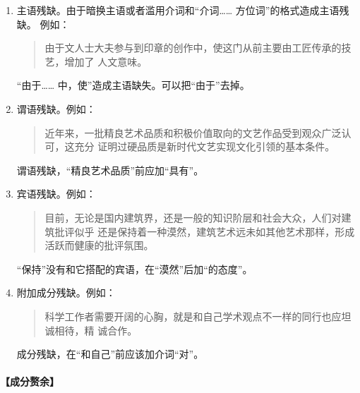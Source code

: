 \documentclass[final,oneside]{ctexbook}
\newenvironment{equotation}{\begin{quotation}\kaishu}{\end{quotation}}
\begin{document}
\begin{enumerate}
  \item 主语残缺。由于暗换主语或者滥用介词和“介词…… 方位词”的格式造成主语残缺。
    例如：

    \begin{equotation}
      由于文人士大夫参与到印章的创作中，使这门从前主要由工匠传承的技艺，增加了
      人文意味。
    \end{equotation}

    “由于…… 中，使”造成主语缺失。可以把“由于”去掉。

  \item 谓语残缺。例如：

    \begin{equotation}
      近年来，一批精良艺术品质和积极价值取向的文艺作品受到观众广泛认可，这充分
      证明过硬品质是新时代文艺实现文化引领的基本条件。
    \end{equotation}

    谓语残缺，“精良艺术品质”前应加“具有”。

  \item 宾语残缺。例如：

    \begin{equotation}
      目前，无论是国内建筑界，还是一般的知识阶层和社会大众，人们对建筑批评似乎
      还是保持着一种漠然，建筑艺术远未如其他艺术那样，形成活跃而健康的批评氛围。
    \end{equotation}

    “保持”没有和它搭配的宾语，在“漠然”后加“的态度”。

  \item 附加成分残缺。例如：

    \begin{equotation}
      科学工作者需要开阔的心胸，就是和自己学术观点不一样的同行也应坦诚相待，精
      诚合作。
    \end{equotation}

    成分残缺，在“和自己”前应该加介词“对”。
\end{enumerate}

\paragraph{【成分赘余】}
\end{document}
